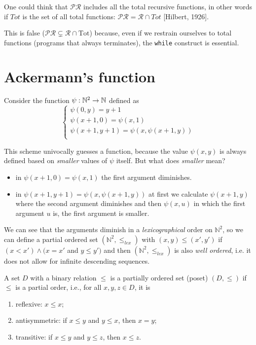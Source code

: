 One could think that $\mathcal{PR}$ includes all the total recursive
functions, in other words if $Tot$ is the set of all total functions:
$\mathcal{PR} = \mathcal{R} \cap Tot$ [Hilbert, 1926].

This is false
($\mathcal{PR} \subsetneq \mathcal{R} \cap \text{Tot}$) because, even
if we restrain ourselves to total functions (programs that always
terminates), the \texttt{while} construct is essential.

\section{Ackermann's function}
Consider the function $ \psi: \mathbb{N}^2 \rightarrow \mathbb{N} $ defined as
\begin{equation*}
  \begin{cases}
    \psi(0,y) = y+1\\
    \psi(x+1,0) = \psi(x,1)\\
    \psi(x+1,y+1) = \psi(x, \psi(x+1, y))\\
  \end{cases}
\end{equation*}

This scheme univocally
guesses a function, because the value $\psi(x,y)$ is always defined
based on \emph{smaller} values of $\psi$ itself. But what does \emph{smaller} mean?

\begin{itemize}
  \item in $\psi(x+1,0) = \psi(x,1)$ the first argument
  diminishes.
  \item in $\psi(x+1,y+1)=\psi(x, \psi(x+1, y))$ at first we calculate $\psi(x+1, y)$
  where the second argument diminishes and then $\psi(x,u)$ in which the first argument
  $u$ is, the first argument is smaller.
\end{itemize}
 

We can see that the arguments diminish in a \emph{lexicographical}
order on $\mathbb{N}^2$, so we can define a partial ordered set 
$(\mathbb{N}^2, \leq_{lex} )$ with $(x,y) \leq (x', y')$
if $(x < x') \wedge (x=x'$ and $y \leq y')$ and then
$( \mathbb{N}^2, \leq_{lex} )$ is also \emph{well ordered}, i.e.
it does not allow for infinite descending sequences.

\begin{definition}
  A set $D$ with a binary relation $\leq$ is a partially ordered set (poset) $(D, \leq)$ if $\leq$ is a partial order, i.e., for all $x,y,z\in D$, it is
  \begin{enumerate}
    \item reflexive: $ x\leq x $;
    \item antisymmetric: if $ x\leq y $ and $ y\leq x $, then $ x=y $;
    \item transitive: if $ x\leq y $ and $ y\leq z $, then $ x \leq z $.
  \end{enumerate}
\end{definition}

